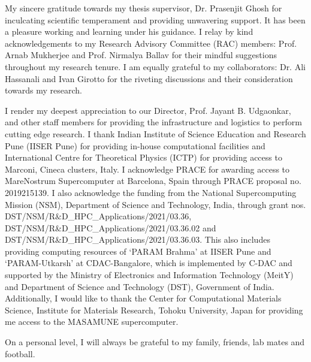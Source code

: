 \begin{acknowledgements}
\noindent My sincere gratitude towards my thesis supervisor, Dr. Prasenjit Ghosh for inculcating scientific temperament and providing unwavering support. It has been a pleasure working and learning under his guidance.
I relay by kind acknowledgements to my  Research Advisory Committee (RAC) members: Prof. Arnab Mukherjee and Prof. Nirmalya Ballav for their mindful suggestions throughout my research tenure. I am equally grateful to my collaborators: Dr. Ali Hassanali and Ivan Girotto for the riveting discussions and their consideration towards my research.  

\noindent I render my deepest appreciation to our Director, Prof. Jayant B. Udgaonkar, and other staff members for providing the infrastructure and logistics to perform cutting edge research. I thank Indian Institute of Science Education and Research Pune (IISER Pune) for providing in-house computational facilities and International Centre for Theoretical Physics (ICTP) for providing access to Marconi, Cineca clusters, Italy. I acknowledge PRACE for awarding access to MareNostrum Supercomputer at Barcelona, Spain through PRACE proposal no. 2019215139. I also acknowledge the funding from the National Supercomputing Mission (NSM), Department of Science and Technology, India, through grant nos. DST/NSM/R$\&$D\_HPC\_Applications/2021/03.36, \\ DST/NSM/R\&D\_HPC\_Applications/2021/03.36.02 and \\ DST/NSM/R\&D\_HPC\_Applications/2021/03.36.03. This also includes providing computing resources of `PARAM Brahma’ at IISER Pune and `PARAM-Utkarsh' at CDAC-Bangalore, which is implemented by C-DAC and supported by the Ministry of Electronics and Information Technology (MeitY) and Department of Science and Technology (DST), Government of India. Additionally, I would like to thank the Center for Computational Materials Science, Institute for Materials Research, Tohoku University, Japan for providing me access to the MASAMUNE supercomputer.

\noindent On a personal level, I will always be grateful to my family, friends, lab mates and football. 
\end{acknowledgements}


